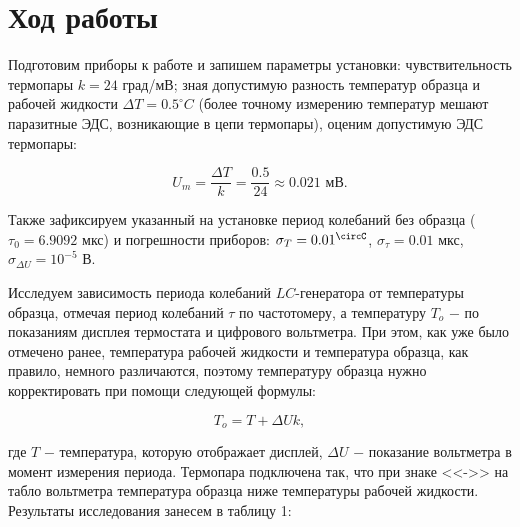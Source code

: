 \documentclass[a4paper,12pt]{article} %
\begin{document}
\section{Ход работы}

\hfill \break Подготовим приборы к работе и запишем параметры установки: чувствительность термопары $k = 24$ град/мВ; зная допустимую разность температур образца и рабочей жидкости $\Delta T = 0.5^\circ C$ (более точному измерению температур мешают паразитные ЭДС, возникающие в цепи термопары), оценим допустимую ЭДС термопары: 

$$
U_{m} = \frac{\Delta T}{k} = \frac{0.5}{24} \approx 0.021 \text{ мВ}.
$$

\hfill \break Также зафиксируем указанный на установке период колебаний без образца ($\tau_{0} = 6.9092$ мкс) и погрешности приборов: $\sigma_{T} = 0.01^\circC$, $\sigma_{\tau} = 0.01$ мкс, $\sigma_{\Delta U} = 10^{-5}$ В.

\hfill \break Исследуем зависимость периода колебаний $LC$-генератора от температуры образца, отмечая период колебаний $\tau$ по частотомеру, а температуру $T_{o}$ $-$ по показаниям дисплея термостата и цифрового вольтметра. При этом, как уже было отмечено ранее, температура рабочей жидкости и температура образца, как правило, немного различаются, поэтому температуру образца нужно корректировать при помощи следующей формулы:

$$
T_{o} = T + \Delta Uk,
$$

\hfill \break где $T$ $-$ температура, которую отображает дисплей, $\Delta U$ $-$ показание вольтметра в момент измерения периода. Термопара подключена так, что при знаке <<->> на табло вольтметра температура образца ниже температуры рабочей жидкости. Результаты исследования занесем в таблицу 1:
\end{document}
